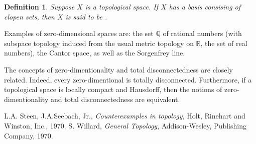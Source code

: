 \documentclass[12pt]{article}
\newtheorem{defn}{Definition}
\begin{document}
\begin{defn} \cite{steen, willard}
Suppose $X$ is a topological space. If $X$ has a basis consising of
clopen sets, then $X$ is said to be . 
\end{defn}

Examples of zero-dimensional spaces are: the set $\mathbb{Q}$ of rational numbers (with subspace topology induced from the usual metric topology on $\mathbb{R}$, the set of real numbers), the Cantor space, as well as the Sorgenfrey line.

The concepts of zero-dimentionality and total disconnectedness are closely related.  Indeed, every zero-dimentional  is totally disconnected.  Furthermore, if a topological space is locally compact and Hausdorff, then the notions of zero-dimentionality and total disconnectedness are equivalent.


\begin{thebibliography}{9}
 L.A. Steen, J.A.Seebach, Jr.,
\emph{Counterexamples in topology},
Holt, Rinehart and Winston, Inc., 1970.
 S. Willard, \emph{General Topology},
Addison-Wesley, Publishing Company, 1970.
\end{thebibliography}
\end{document}
